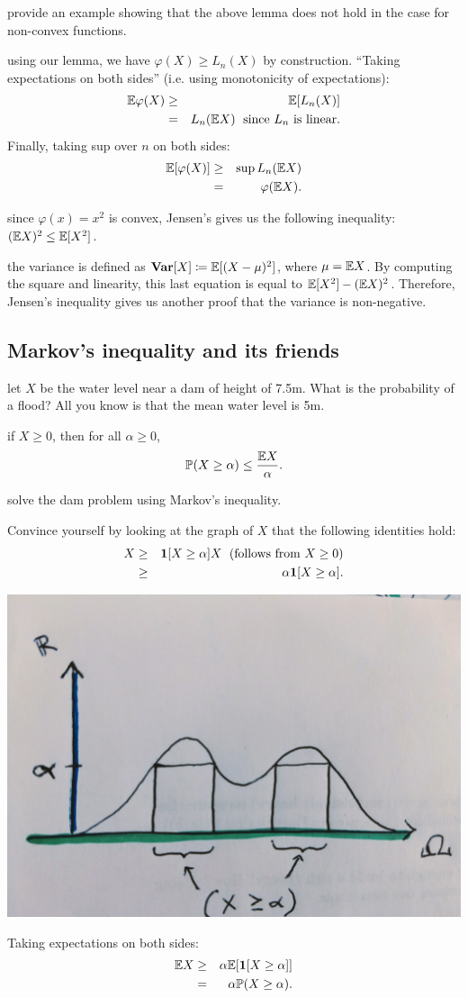 \documentclass{article}
\begin{document}
 provide an example showing that the above lemma does not hold in the case for non-convex functions.

 using our lemma, we have $\varphi(X) \ge L_n(X)$ by construction. ``Taking expectations on both sides'' (i.e. using monotonicity of expectations):
\begin{eqnarray}
{\mathbb E}\varphi(X) &\ge& {\mathbb E}[L_n(X)] \\
&=& L_n({\mathbb E} X) \;\text{ since }L_n\text{ is linear.}
\end{eqnarray}
Finally, taking sup over $n$ on both sides:
\begin{eqnarray}
{\mathbb E}[\varphi(X)] &\ge& \sup L_n({\mathbb E} X) \\ 
&=& \varphi({\mathbb E} X).
\end{eqnarray}

 since $\varphi(x) = x^2$ is convex, Jensen's gives us the following inequality: $({\mathbb E} X)^2 \le {\mathbb E}[X^2]$.

 the variance is defined as ${\text {\bf Var}}[X] \coloneqq {\mathbb E}[(X - \mu)^2]$, where $\mu = {\mathbb E} X$. By computing the square and linearity, this last equation is equal to ${\mathbb E}[X^2] - ({\mathbb E} X)^2$.  Therefore, Jensen's inequality gives us another proof that the variance is non-negative.


\subsection{Markov's inequality and its friends}

 let $X$ be the water level near a dam of height of 7.5m. What is the probability of a flood? All you know is that the mean water level is 5m.

 if $X \ge 0$, then for all $\alpha \ge 0$, 
\[ {\mathbb P}( X \ge \alpha) \le \frac{{\mathbb E} X}{\alpha}. \]

 solve the dam problem using Markov's inequality.

 Convince yourself by looking at the graph of $X$ that the following identities hold: 
\begin{eqnarray*} 
X &\ge& {\mathbf 1}[X \ge \alpha] X\;\text{ (follows from }X \ge 0\text{)} \\
&\ge& \alpha {\mathbf 1}[X \ge \alpha].
\end{eqnarray*}
\begin{center}
	\includegraphics[width=0.5\linewidth]{figures/markov}
\end{center}
Taking expectations on both sides:
\begin{eqnarray*}
{\mathbb E} X &\ge& \alpha {\mathbb E}[{\mathbf 1}[X \ge \alpha]] \\
&=& \alpha {\mathbb P}(X \ge \alpha).
\end{eqnarray*}
\end{document}
